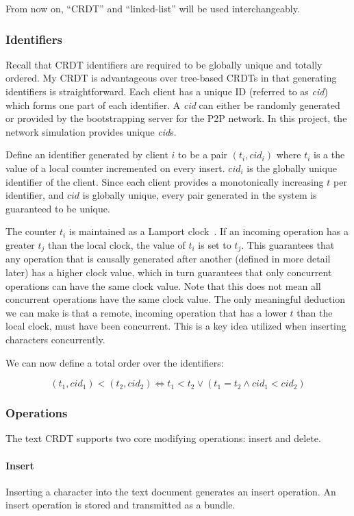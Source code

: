 \documentclass[12pt,a4paper,twoside,openright]{report}
\begin{document}
		From now on, ``CRDT'' and ``linked-list'' will be used interchangeably.
	
		\subsubsection{Identifiers}
		
		Recall that CRDT identifiers are required to be globally unique and totally ordered. My CRDT is advantageous over tree-based CRDTs in that generating identifiers is straightforward. Each client has a unique ID (referred to as \textit{cid}) which forms one part of each identifier. A \textit{cid} can either be randomly generated or provided by the bootstrapping server for the P2P network. In this project, the network simulation provides unique \textit{cid}s.
		
		Define an identifier generated by client $i$ to be a pair $(t_i, cid_i)$ where $t_i$ is a the value of a local counter incremented on every insert. $cid_i$ is the globally unique identifier of the client. Since each client provides a monotonically increasing $t$ per identifier, and $cid$ is globally unique, every pair generated in the system is guaranteed to be unique.
		
		The counter $t_i$ is maintained as a Lamport clock~\cite{lamport1978}. If an incoming operation has a greater $t_j$ than the local clock, the value of $t_i$ is set to $t_j$. This guarantees that any operation that is causally generated after another (defined in more detail later) has a higher clock value, which in turn guarantees that only concurrent operations can have the same clock value. Note that this does not mean all concurrent operations have the same clock value. The only meaningful deduction we can make is that a remote, incoming operation that has a lower $t$ than the local clock, must have been concurrent. This is a key idea utilized when inserting characters concurrently.
		
		We can now define a total order over the identifiers:
		
		\[(t_1, cid_1) < (t_2, cid_2) \Leftrightarrow t_1 < t_2 \lor (t_1 = t_2 \land cid_1 < cid_2)\]
		
		
		\subsubsection{Operations}
		The text CRDT supports two core modifying operations: insert and delete.
		
			\paragraph{Insert}
				Inserting a character into the text document generates an insert operation. An insert operation is stored and transmitted as a bundle.
				
\end{document}
